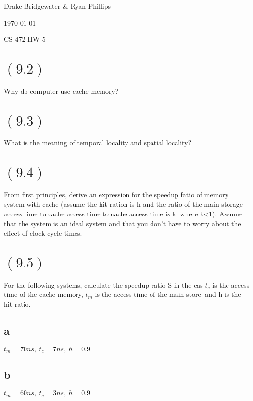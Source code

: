 \documentclass[letterpaper,12pt,titlepage]{article}
\def\name{Drake Bridgewater \& Ryan Phillips}
\begin{document}
\hfill \name

\hfill \today

\hfill CS 472 HW 5

\section*{$(9.2)$} Why do computer use cache memory?

\begin{mdframed}[style=MyFrame]
\end{mdframed}

\section*{$(9.3)$} What is the meaning of temporal locality and spatial locality?

\begin{mdframed}[style=MyFrame]
\end{mdframed}

\section*{$(9.4)$} From first principles, derive an expression for the speedup fatio of memory system with cache (assume the hit ration is h and the ratio of the main storage access time to cache access time to cache access time is k, where k<1). Assume that the system is an ideal system and that you don't have to worry about the effect of clock cycle times.

\begin{mdframed}[style=MyFrame]
\end{mdframed}

\section*{$(9.5)$} For the following systems, calculate the speedup ratio S in the cas $t_c$ is the access time of the cache memory, $t_m$ is the access time of the main store, and h is the hit ratio.

\subsection*{a} $t_m=70ns,~t_c=7ns,~h=0.9$
\begin{mdframed}[style=MyFrame]
\end{mdframed}
\subsection*{b} $t_m=60ns,~t_c=3ns,~h=0.9$
\begin{mdframed}[style=MyFrame]
\end{mdframed}
\end{document}
